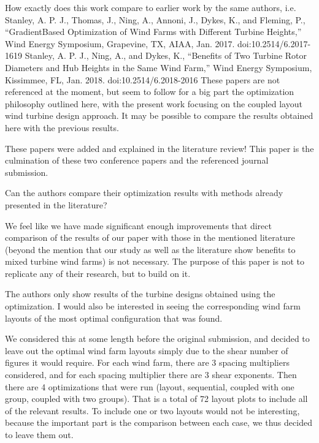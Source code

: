 \documentclass[12pt]{report}
\begin{document}
\bigskip \color{black}
How exactly does this work compare to earlier work by the same authors, i.e. Stanley, A. P. J., Thomas, J., Ning, A., Annoni, J., Dykes, K., and Fleming, P., “GradientBased Optimization of Wind Farms with Different Turbine Heights,” Wind Energy Symposium, Grapevine, TX, AIAA, Jan. 2017. doi:10.2514/6.2017-1619 Stanley, A. P. J., Ning, A., and Dykes, K., “Benefits of Two Turbine Rotor Diameters and Hub Heights in the Same Wind Farm,” Wind Energy Symposium, Kissimmee, FL, Jan. 2018. doi:10.2514/6.2018-2016 These papers are not referenced at the moment, but seem to follow for a big part the optimization philosophy outlined here, with the present work focusing on the coupled layout wind turbine design approach. It may be possible to compare the results obtained here with the previous results.

\color{blue} These papers were added and explained in the literature review! This paper is the culmination of these two conference papers and the referenced journal submission.

\bigskip \color{black}
Can the authors compare their optimization results with methods already presented in the literature?

\color{blue} We feel like we have made significant enough improvements that direct comparison of the results of our paper with those in the mentioned literature (beyond the mention that our study as well as the literature show benefits to mixed turbine wind farms) is not necessary. The purpose of this paper is not to replicate any of their research, but to build on it.

\bigskip \color{black}
The authors only show results of the turbine designs obtained using the optimization. I would also be interested in seeing the corresponding wind farm layouts of the most optimal configuration that was found.

\color{blue} We considered this at some length before the original submission, and decided to leave out the optimal wind farm layouts simply due to the shear number of figures it would require. For each wind farm, there are 3 spacing multipliers considered, and for each spacing multiplier there are 3 shear exponents. Then there are 4 optimizations that were run (layout, sequential, coupled with one group, coupled with two groups). That is a total of 72 layout plots to include all of the relevant results. To include one or two layouts would not be interesting, because the important part is the comparison between each case, we thus decided to leave them out. 
\end{document}
